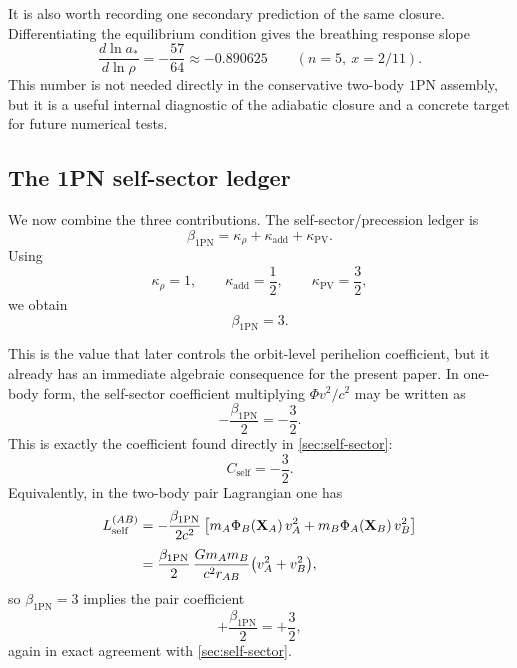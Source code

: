 \documentclass[11pt]{article}
\newcommand{\kadd}{\kappa_{\mathrm{add}}}
\newcommand{\kPV}{\kappa_{\mathrm{PV}}}
\newcommand{\krho}{\kappa_{\rho}}
\newcommand{\betaPN}{\beta_{\mathrm{1PN}}}
\newcommand{\PhiN}{\Phi}
\newcommand{\Cself}{C_{\mathrm{self}}}
\begin{document}
It is also worth recording one secondary prediction of the same closure. Differentiating
the equilibrium condition gives the breathing response slope
\begin{equation}
\frac{d\ln a_*}{d\ln \rho}
=
-\frac{57}{64}
\approx -0.890625
\qquad
(n=5,\ x=2/11).
\label{eq:breathing-slope}
\end{equation}
This number is not needed directly in the conservative two-body \(1\)PN assembly, but it
is a useful internal diagnostic of the adiabatic closure and a concrete target for future
numerical tests.

\subsection{The 1PN self-sector ledger}
\label{sec:self-ledger}

We now combine the three contributions. The self-sector/precession ledger is
\begin{equation}
\betaPN = \krho + \kadd + \kPV.
\label{eq:beta-ledger}
\end{equation}
Using
\begin{equation}
\krho=1,
\qquad
\kadd=\frac12,
\qquad
\kPV=\frac32,
\end{equation}
we obtain
\begin{equation}
\boxed{\betaPN=3.}
\label{eq:beta-three}
\end{equation}

This is the value that later controls the orbit-level perihelion coefficient, but it
already has an immediate algebraic consequence for the present paper. In one-body form,
the self-sector coefficient multiplying \(\PhiN v^2/c^2\) may be written as
\begin{equation}
-\frac{\betaPN}{2}
=
-\frac32.
\label{eq:beta-to-self}
\end{equation}
This is exactly the coefficient found directly in \cref{sec:self-sector}:
\begin{equation}
\Cself=-\frac32.
\label{eq:self-coeff-repeat}
\end{equation}
Equivalently, in the two-body pair Lagrangian one has
\begin{align}
L_{\rm self}^{(AB)}
&=
-\frac{\betaPN}{2c^2}
\left[
m_A\Phi_B(\mathbf X_A)\,v_A^2
+
m_B\Phi_A(\mathbf X_B)\,v_B^2
\right]
\nonumber\\[3pt]
&=
\frac{\betaPN}{2}\,
\frac{Gm_A m_B}{c^2 r_{AB}}
\bigl(v_A^2+v_B^2\bigr),
\label{eq:pair-self-beta}
\end{align}
so \(\betaPN=3\) implies the pair coefficient
\begin{equation}
+\frac{\betaPN}{2}=+\frac32,
\label{eq:pair-self-plus-three-halves}
\end{equation}
again in exact agreement with \cref{sec:self-sector}.
\end{document}
